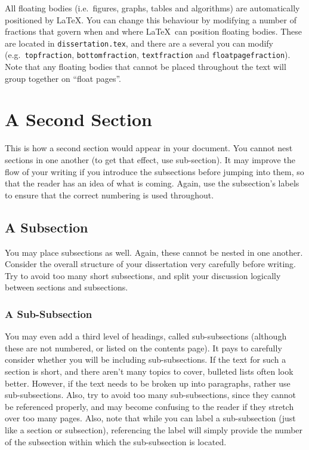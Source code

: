 All floating bodies (i.e.\ figures, graphs, tables and algorithms) are automatically positioned by \LaTeX. You can change this behaviour by modifying a number of fractions that govern when and where \LaTeX\ can position floating bodies. These are located in \texttt{dissertation.tex}, and there are a several you can modify (e.g.\ \texttt{topfraction}, \texttt{bottomfraction}, \texttt{textfraction} and \texttt{floatpagefraction}). Note that any floating bodies that cannot be placed throughout the text will group together on ``float pages''.


\section{A Second Section}
\label{sec:first:second_sec}

This is how a second section would appear in your document. You cannot nest sections in one another (to get that effect, use sub-section). It may improve the flow of your writing if you introduce the subsections before jumping into them, so that the reader has an idea of what is coming. Again, use the subsection's labels to ensure that the correct numbering is used throughout.


\subsection{A Subsection}
\label{sec:first:second_sec:sub}

You may place subsections as well. Again, these cannot be nested in one another. Consider the overall structure of your dissertation very carefully before writing. Try to avoid too many short subsections, and split your discussion logically between sections and subsections.

\subsubsection{A Sub-Subsection}
\label{sec:first:second_sec:sub:subsub}

You may even add a third level of headings, called sub-subsections (although these are not numbered, or listed on the contents page). It pays to carefully consider whether you will be including sub-subsections. If the text for such a section is short, and there aren't many topics to cover, bulleted lists often look better. However, if the text needs to be broken up into paragraphs, rather use sub-subsections. Also, try to avoid too many sub-subsections, since they cannot be referenced properly, and may become confusing to the reader if they stretch over too many pages. Also, note that while you can label a sub-subsection (just like a section or subsection), referencing the label will simply provide the number of the subsection within which the sub-subsection is located.

